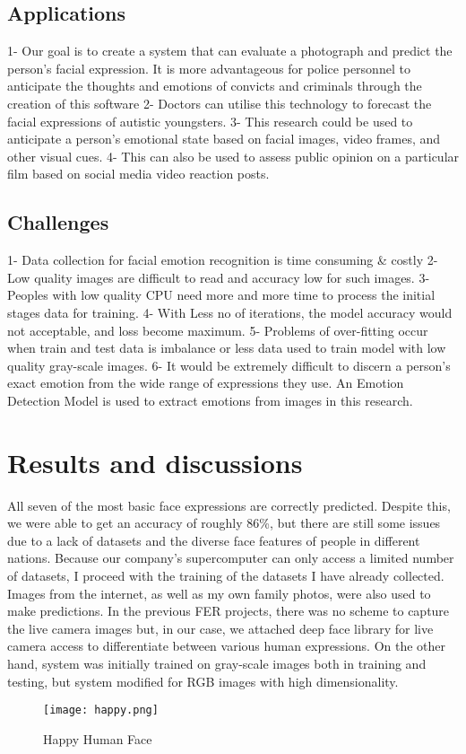 \documentclass{ieeeaccess}
\begin{document}
\subsection{Applications}
1- Our goal is to create a system that can evaluate a photograph and predict the person's facial expression. It is more advantageous for police personnel to anticipate the thoughts and emotions of convicts and criminals through the creation of this software
2- Doctors can utilise this technology to forecast the facial expressions of autistic youngsters.
3- This research could be used to anticipate a person's emotional state based on facial images, video frames, and other visual cues.
4- This can also be used to assess public opinion on a particular film based on social media video reaction posts.

\subsection{Challenges}
1- Data collection for facial emotion recognition is time consuming & costly
2- Low quality images are difficult to read and accuracy low for such images.
3- Peoples with low quality CPU need more and more time to process the initial stages data for training. 
4- With Less no of iterations, the model accuracy would not acceptable, and loss become maximum.
5- Problems of over-fitting occur when train and test data is imbalance or less data used to train model with low quality gray-scale images. 
6- It would be extremely difficult to discern a person's exact emotion from the wide range of expressions they use. An Emotion Detection Model is used to extract emotions from images in this research.

\section{Results and discussions}
All seven of the most basic face expressions are correctly predicted. Despite this, we were able to get an accuracy of roughly 86\%, but there are still some issues due to a lack of datasets and the diverse face features of people in different nations. Because our company's supercomputer can only access a limited number of datasets, I proceed with the training of the datasets I have already collected. Images from the internet, as well as my own family photos, were also used to make predictions.
In the previous FER projects, there was no scheme to capture the live camera images but, in our case, we attached deep face library for live camera access to differentiate between various human expressions.  On the other hand, system was initially trained on gray-scale images both in training and testing, but system modified for RGB images with high dimensionality.
\begin{figure}[h]
\centering
\texttt{[image: happy.png]}
\caption{Happy Human Face}
\end{figure}
\end{document}
